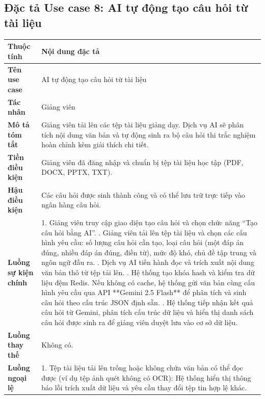\documentclass[../DoAn.tex]{subfiles}
\begin{document}
\subsection{Đặc tả Use case 8: AI tự động tạo câu hỏi từ tài liệu}
\nopagebreak
\begingroup
\centering
\fontsize{11pt}{14pt}\selectfont
\begin{tabular}{|p{3.2cm}|p{10.8cm}|}
\hline
\textbf{Thuộc tính} & \textbf{Nội dung đặc tả} \\ \hline
\textbf{Tên use case} & AI tự động tạo câu hỏi từ tài liệu \\ \hline
\textbf{Tác nhân} & Giảng viên \\ \hline
\textbf{Mô tả tóm tắt} & Giảng viên tải lên các tệp tài liệu giảng dạy. Dịch vụ AI sẽ phân tích nội dung văn bản và tự động sinh ra bộ câu hỏi thi trắc nghiệm hoàn chỉnh kèm giải thích chi tiết. \\ \hline
\textbf{Tiền điều kiện} & Giảng viên đã đăng nhập và chuẩn bị tệp tài liệu học tập (PDF, DOCX, PPTX, TXT). \\ \hline
\textbf{Hậu điều kiện} & Các câu hỏi được sinh thành công và có thể lưu trữ trực tiếp vào ngân hàng câu hỏi. \\ \hline
\textbf{Luồng sự kiện chính} & 
1. Giảng viên truy cập giao diện tạo câu hỏi và chọn chức năng ``Tạo câu hỏi bằng AI''. \newline
2. Giảng viên tải lên tệp tài liệu và chọn các cấu hình yêu cầu: số lượng câu hỏi cần tạo, loại câu hỏi (một đáp án đúng, nhiều đáp án đúng, điền từ), mức độ khó, chủ đề tập trung và ngôn ngữ đầu ra. \newline
3. Dịch vụ AI tiến hành đọc và trích xuất nội dung văn bản thô từ tệp tải lên. \newline
4. Hệ thống tạo khóa hash và kiểm tra dữ liệu đệm Redis. Nếu không có cache, hệ thống gửi văn bản cùng cấu hình yêu cầu qua API **Gemini 2.5 Flash** để phân tích và sinh câu hỏi theo cấu trúc JSON định sẵn. \newline
5. Hệ thống tiếp nhận kết quả câu hỏi từ Gemini, phân tích cấu trúc dữ liệu và hiển thị danh sách câu hỏi được sinh ra để giảng viên duyệt lưu vào cơ sở dữ liệu. \\ \hline
\textbf{Luồng thay thế} & Không có. \\ \hline
\textbf{Luồng ngoại lệ} & 
1. Tệp tài liệu tải lên trống hoặc không chứa văn bản có thể đọc được (ví dụ tệp ảnh quét không có OCR): Hệ thống hiển thị thông báo lỗi trích xuất dữ liệu và yêu cầu thay đổi tệp tin hợp lệ khác. \\ \hline
\end{tabular}
\label{table:uc_ai_generate_questions}
\par
\endgroup
\end{document}
